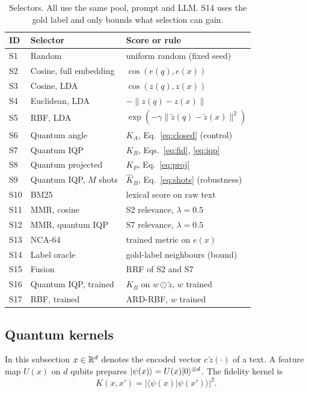 \begin{table}[t]
\centering
\caption{Selectors. All use the same pool, prompt and LLM. S14 uses the gold label and only bounds what
selection can gain.}
\label{tab:selectors}
\footnotesize
\setlength{\tabcolsep}{3pt}
\begin{tabular}{@{}lll@{}}
\toprule
ID & Selector & Score or rule \\
\midrule
S1 & Random & uniform random (fixed seed) \\
S2 & Cosine, full embedding & $\cos(e(q),e(x))$ \\
S3 & Cosine, LDA & $\cos(z(q),z(x))$ \\
S4 & Euclidean, LDA & $-\lVert z(q)-z(x)\rVert$ \\
S5 & RBF, LDA & $\exp(-\gamma\lVert \tilde z(q)-\tilde z(x)\rVert^2)$ \\
S6 & Quantum angle & $K_A$, Eq.~\eqref{eq:closed} (control) \\
S7 & Quantum IQP & $K_B$, Eqs.~\eqref{eq:fid}, \eqref{eq:iqp} \\
S8 & Quantum projected & $K_P$, Eq.~\eqref{eq:proj} \\
S9 & Quantum IQP, $M$ shots & $\hat K_B$, Eq.~\eqref{eq:shots} (robustness) \\
\midrule
S10 & BM25 & lexical score on raw text \\
S11 & MMR, cosine & S2 relevance, $\lambda=0.5$ \\
S12 & MMR, quantum IQP & S7 relevance, $\lambda=0.5$ \\
S13 & NCA-64 & trained metric on $e(x)$ \\
S14 & Label oracle & gold-label neighbours (bound) \\
S15 & Fusion & RRF of S2 and S7 \\
\midrule
S16 & Quantum IQP, trained & $K_B$ on $w\odot\tilde z$, $w$ trained \\
S17 & RBF, trained & ARD-RBF, $w$ trained \\
\bottomrule
\end{tabular}
\end{table}

\subsection{Quantum kernels}
In this subsection $x\in\mathbb{R}^d$ denotes the encoded vector $c\,\tilde z(\cdot)$ of a text. A feature
map $U(x)$ on $d$ qubits prepares $\lvert \psi(x) \rangle=U(x)\lvert 0 \rangle^{\otimes d}$. The fidelity kernel is
\begin{equation}
K(x,x') = \bigl|\langle\psi(x)|\psi(x')\rangle\bigr|^2 .
\label{eq:fid}
\end{equation}

